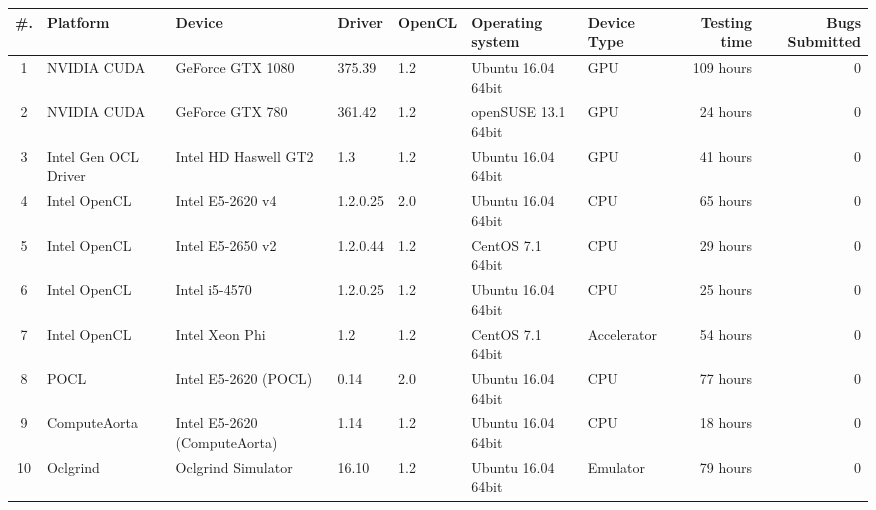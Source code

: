 \begin{tabular}{ cllllll | rr }
\toprule
\textbf{\#. } & \textbf{Platform} & \textbf{Device} & \textbf{Driver} & \textbf{OpenCL} & 
\textbf{Operating system} & \textbf{Device Type} & \textbf{Testing time} & \textbf{Bugs Submitted} \\
\midrule
1 & NVIDIA CUDA & GeForce GTX 1080 & 375.39 & 1.2 & Ubuntu 16.04 64bit & GPU & 109 hours & 0 \\
2 & NVIDIA CUDA & GeForce GTX 780 & 361.42 & 1.2 & openSUSE  13.1 64bit & GPU & 24 hours & 0 \\
3 & Intel Gen OCL Driver & Intel HD Haswell GT2 & 1.3 & 1.2 & Ubuntu 16.04 64bit & GPU & 41 hours & 0 \\
4 & Intel OpenCL & Intel E5-2620 v4 & 1.2.0.25 & 2.0 & Ubuntu 16.04 64bit & CPU & 65 hours & 0 \\
5 & Intel OpenCL & Intel E5-2650 v2 & 1.2.0.44 & 1.2 & CentOS 7.1 64bit & CPU & 29 hours & 0 \\
6 & Intel OpenCL & Intel i5-4570 & 1.2.0.25 & 1.2 & Ubuntu 16.04 64bit & CPU & 25 hours & 0 \\
7 & Intel OpenCL & Intel Xeon Phi & 1.2 & 1.2 & CentOS 7.1 64bit & Accelerator & 54 hours & 0 \\
8 & POCL & Intel E5-2620 (POCL) & 0.14 & 2.0 & Ubuntu 16.04 64bit & CPU & 77 hours & 0 \\
9 & ComputeAorta & Intel E5-2620 (ComputeAorta) & 1.14 & 1.2 & Ubuntu 16.04 64bit & CPU & 18 hours & 0 \\
10 & Oclgrind & Oclgrind Simulator & 16.10 & 1.2 & Ubuntu 16.04 64bit & Emulator & 79 hours & 0 \\

\bottomrule
\end{tabular}

